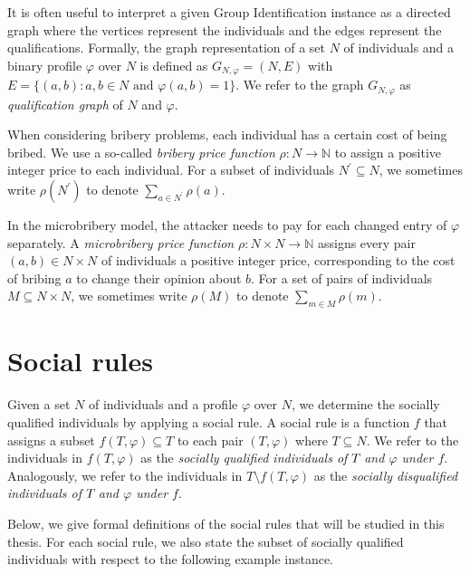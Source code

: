 \documentclass[
    12pt,               %
    a4paper,            %
    bibtotoc,           %
    pointlessnumbers,   %
    ngerman,            %
    titlepage,          %
    leqno,              %
    ]{scrarticle}       %
\begin{document}
It is often useful to interpret a given Group Identification instance as a directed graph where the vertices represent the individuals and the edges represent the qualifications. Formally, the graph representation of a set $N$ of individuals and a binary profile $\varphi$ over $N$ is defined as $G_{N, \varphi} = (N, E)$ with $E = \{ (a, b) : a, b \in N \text{ and } \varphi(a, b) = 1 \}$. We refer to the graph $G_{N, \varphi}$ as \emph{qualification graph} of $N$ and $\varphi$.

When considering bribery problems, each individual has a certain cost of being bribed. We use a so-called \emph{bribery price function} $\rho : N \rightarrow \mathbb{N}$ to assign a positive integer price to each individual. For a subset of individuals $N^\prime \subseteq N$, we sometimes write $\rho(N^\prime)$ to denote $\sum_{a \in N^\prime} \rho(a)$.

In the microbribery model, the attacker needs to pay for each changed entry of $\varphi$ separately. A \emph{microbribery price function} $\rho : N \times N \rightarrow \mathbb{N}$ assigns every pair $(a, b) \in N \times N$ of individuals a positive integer price, corresponding to the cost of bribing $a$ to change their opinion about $b$. For a set of pairs of individuals $M \subseteq N \times N$, we sometimes write $\rho(M)$ to denote $\sum_{m \in M} \rho(m)$.










\clearpage

\section{Social rules}
\label{sec:social_rules}

Given a set $N$ of individuals and a profile $\varphi$ over $N$, we determine the socially qualified individuals by applying a social rule. A social rule is a function $f$ that assigns a subset $f(T, \varphi) \subseteq T$ to each pair $(T, \varphi)$ where $T \subseteq N$. We refer to the individuals in $f(T, \varphi)$ as the \emph{socially qualified individuals of \thinspace$T\thinspace$and $\varphi$ under $f$}. Analogously, we refer to the individuals in $T \setminus f(T, \varphi)$ as the \emph{socially disqualified individuals of \thinspace$T\thinspace$and $\varphi$ under $f$}.

Below, we give formal definitions of the social rules that will be studied in this thesis. For each social rule, we also state the subset of socially qualified individuals with respect to the following example instance.
\end{document}
